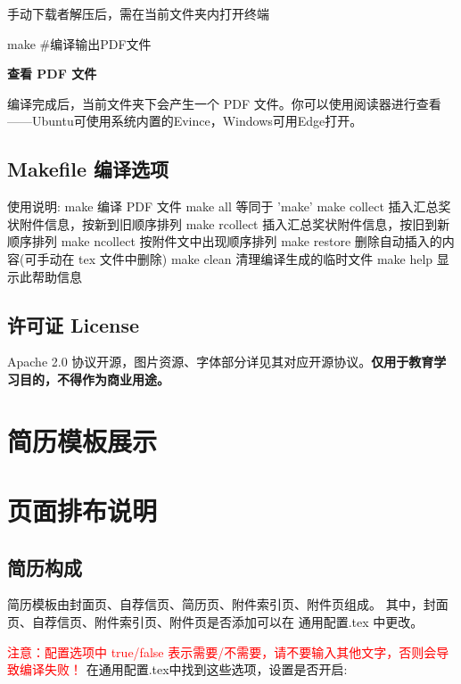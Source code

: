 \documentclass[a4paper,12pt]{ctexart}
\newcommand{\ppic}[2]{
	\begin{figure}[!h]
		\centering
		\fbox{
			\texttt{[image: \#2]}
		}
	\end{figure}
}
\newcommand{\emp}[1]{
	\colorbox{spanbg}{#1}
}
\begin{document}
	\qquad 手动下载者解压后，需在当前文件夹内打开终端
	\begin{bashcode}[xleftmargin=4em]
  make #编译输出PDF文件
	\end{bashcode}
	
	\textbf{查看 PDF 文件}
	
	\qquad 编译完成后，当前文件夹下会产生一个 PDF 文件。你可以使用阅读器进行查看——Ubuntu可使用系统内置的Evince，Windows可用Edge打开。
		
	\subsection{Makefile 编译选项}
	\begin{bashcode}
  使用说明:
	make              编译 PDF 文件
	make all          等同于 'make'
	make collect      插入汇总奖状附件信息，按新到旧顺序排列
	make rcollect     插入汇总奖状附件信息，按旧到新顺序排列
	make ncollect     按附件文中出现顺序排列
	make restore      删除自动插入的内容(可手动在 tex 文件中删除)
	make clean        清理编译生成的临时文件
	make help         显示此帮助信息
	
	\end{bashcode}
	
	\subsection{许可证 License}
	Apache 2.0 协议开源，图片资源、字体部分详见其对应开源协议。\textbf{仅用于教育学习目的，不得作为商业用途。}
	
	\newpage
	\section{简历模板展示}
	\ppic{width=6in}{resume-sample.jpg}
	
	\newpage
	\section{页面排布说明}
	
	\subsection{简历构成}
	简历模板由封面页、自荐信页、简历页、附件索引页、附件页组成。
	其中，封面页、自荐信页、附件索引页、附件页是否添加可以在\emp{通用配置.tex}中更改。
	
	\textcolor{red}{注意：配置选项中 true/false 表示需要/不需要，请不要输入其他文字，否则会导致编译失败！}
	在通用配置.tex中找到这些选项，设置是否开启:
	\begin{latexcode}
    \def\theCoverPageNeed{false} %
    \def\theCoverLetterNeed{true}  %
    \def\theAttachmentIndexPageNeed{true} %
    \def\theAttachmentPageNeed{true}  %
	\end{latexcode}
	
\end{document}

